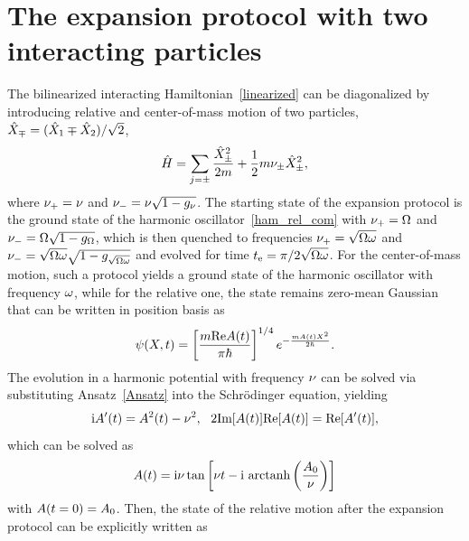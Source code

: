 \documentclass[reprint,prx,footinbib,floatfix,twocolumn,longbibliography,superscriptaddress]{revtex4-2}
\begin{document}
\section{The expansion protocol with two interacting particles}
\label{appF}
The bilinearized interacting Hamiltonian~\eqref{linearized} can be diagonalized by introducing relative and center-of-mass motion of two particles, $\hat{X}_\mp = (\hat{X}_1 \mp \hat{X}_2) /\sqrt{2}$,
\begin{align}
    \hat{H} = \sum_{j=\pm} \frac{\hat{X}^2_\pm}{2 m} + \frac{1}{2} m \nu_\pm \hat{X}^2_\pm,
    \label{ham_rel_com}
\end{align}
where $\nu_+ = \nu$ and $\nu_- = \nu \sqrt{1-g_\nu}$.
The starting state of the expansion protocol is the ground state of the harmonic oscillator~\eqref{ham_rel_com} with $\nu_+ = \Omega$ and $\nu_- = \Omega \sqrt{1-g_\Omega}$, which is then quenched to frequencies $\nu_+ = \sqrt{\Omega \omega}$ and $\nu_- = \sqrt{\Omega \omega}\sqrt{1-g_{\sqrt{\Omega \omega}}}$ and evolved for time $t_{\text{e}} = \pi / 2 \sqrt{\Omega \omega}$.
For the center-of-mass motion, such a protocol yields a ground state of the harmonic oscillator with frequency $\omega$, while for the relative one, the state remains zero-mean Gaussian that can be written in position basis as
\begin{align}
    \psi(X,t) = \left[ \frac{m \text{Re} A(t)}{\pi \hbar}\right]^{1/4} e^{-\frac{m A(t) X^2 }{2 \hbar}}.
    \label{Ansatz}
\end{align}
The evolution in a harmonic potential with frequency $\nu$ can be solved via substituting Ansatz~\eqref{Ansatz} into the Schrödinger equation, yielding
\begin{align}
    \text{i} A'(t) = A^2(t) - \nu^2, \ \ 2 \text{Im}[A(t)] \text{Re}[A(t)] = \text{Re}[A'(t)],
\end{align}
which can be solved as
\begin{align}
    \PhaseFunction (\DimTime) = \ImagUnit \UnFreq \tan \left[ \UnFreq \DimTime - \ImagUnit \ \text{arctanh}\rounds{\frac{\PhaseFunction_0}{\UnFreq}} \right]
\end{align}
with $A(t = 0) = A_0$.
Then, the state of the relative motion after the expansion protocol can be explicitly written as
\end{document}
